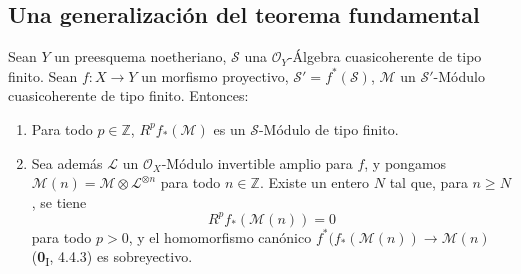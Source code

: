 \subsection{Una generalización del teorema fundamental}
\label{subsection:III.2.4}
\label{subsection:III.2.4-fr}

\begin{theorem}[2.4.1]
\label{III.2.4.1-fr}
Sean $Y$ un preesquema noetheriano, $\mathcal S$ una
$\mathcal O_Y$-Álgebra cuasicoherente de tipo finito. Sean
$f:X\to Y$ un morfismo proyectivo, $\mathcal S'=f^*(\mathcal S)$,
$\mathcal M$ un $\mathcal S'$-Módulo cuasicoherente de tipo finito.
Entonces:
\begin{enumerate}
\item[\textup{(i)}] Para todo $p\in\mathbb Z$, $R^pf_*(\mathcal M)$ es un
$\mathcal S$-Módulo de tipo finito.
\item[\textup{(ii)}] Sea además $\mathcal L$ un $\mathcal O_X$-Módulo invertible
amplio para $f$, y pongamos
$\mathcal M(n)=\mathcal M\otimes\mathcal L^{\otimes n}$ para todo
$n\in\mathbb Z$. Existe un entero $N$ tal que, para $n\geq N$, se tiene
\[
R^pf_*(\mathcal M(n))=0
\tag{2.4.1.1}\label{III.2.4.1.1-fr}
\]
para todo $p>0$, y el homomorfismo canónico
$f^*(f_*(\mathcal M(n))\longrightarrow\mathcal M(n)$
\textup{(\textbf{0}\textsubscript{I}, 4.4.3)} es sobreyectivo.
\end{enumerate}
\end{theorem}

